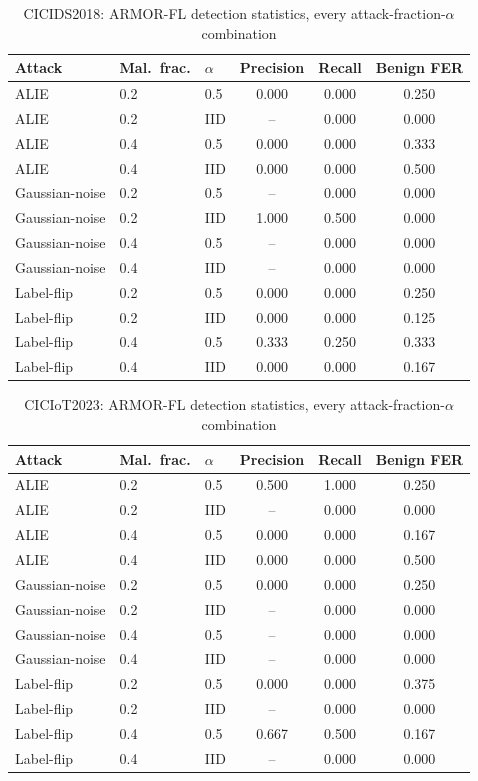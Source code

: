 \documentclass[a4paper,11pt]{article}
\begin{document}
\begin{table}[htbp]
\centering
\caption{CICIDS2018: ARMOR-FL detection statistics, every attack-fraction-$\alpha$ combination}\label{tab:appdetcicids2018}
\begin{tabular}{@{}lllccc@{}}
\toprule
Attack & Mal.\ frac. & $\alpha$ & Precision & Recall & Benign FER \\
\midrule
ALIE & 0.2 & 0.5 & 0.000 & 0.000 & 0.250 \\
ALIE & 0.2 & IID & -- & 0.000 & 0.000 \\
ALIE & 0.4 & 0.5 & 0.000 & 0.000 & 0.333 \\
ALIE & 0.4 & IID & 0.000 & 0.000 & 0.500 \\
Gaussian-noise & 0.2 & 0.5 & -- & 0.000 & 0.000 \\
Gaussian-noise & 0.2 & IID & 1.000 & 0.500 & 0.000 \\
Gaussian-noise & 0.4 & 0.5 & -- & 0.000 & 0.000 \\
Gaussian-noise & 0.4 & IID & -- & 0.000 & 0.000 \\
Label-flip & 0.2 & 0.5 & 0.000 & 0.000 & 0.250 \\
Label-flip & 0.2 & IID & 0.000 & 0.000 & 0.125 \\
Label-flip & 0.4 & 0.5 & 0.333 & 0.250 & 0.333 \\
Label-flip & 0.4 & IID & 0.000 & 0.000 & 0.167 \\
\bottomrule
\end{tabular}
\end{table}

\begin{table}[htbp]
\centering
\caption{CICIoT2023: ARMOR-FL detection statistics, every attack-fraction-$\alpha$ combination}\label{tab:appdetciciot2023}
\begin{tabular}{@{}lllccc@{}}
\toprule
Attack & Mal.\ frac. & $\alpha$ & Precision & Recall & Benign FER \\
\midrule
ALIE & 0.2 & 0.5 & 0.500 & 1.000 & 0.250 \\
ALIE & 0.2 & IID & -- & 0.000 & 0.000 \\
ALIE & 0.4 & 0.5 & 0.000 & 0.000 & 0.167 \\
ALIE & 0.4 & IID & 0.000 & 0.000 & 0.500 \\
Gaussian-noise & 0.2 & 0.5 & 0.000 & 0.000 & 0.250 \\
Gaussian-noise & 0.2 & IID & -- & 0.000 & 0.000 \\
Gaussian-noise & 0.4 & 0.5 & -- & 0.000 & 0.000 \\
Gaussian-noise & 0.4 & IID & -- & 0.000 & 0.000 \\
Label-flip & 0.2 & 0.5 & 0.000 & 0.000 & 0.375 \\
Label-flip & 0.2 & IID & -- & 0.000 & 0.000 \\
Label-flip & 0.4 & 0.5 & 0.667 & 0.500 & 0.167 \\
Label-flip & 0.4 & IID & -- & 0.000 & 0.000 \\
\bottomrule
\end{tabular}
\end{table}
\end{document}
